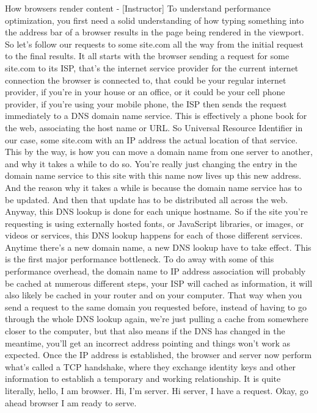 How browsers render content - [Instructor] To understand performance optimization, you first need a solid
understanding of how typing something into the address bar of a browser results 
in the page being rendered in the viewport. So let's follow our requests to some
site.com all the way from the initial request to the final results. It all 
starts with the browser sending a request for some site.com to its ISP, that's 
the internet service provider for the current internet connection the browser is
connected to, that could be your regular internet provider, if you're in your 
house or an office, or it could be your cell phone provider, if you're using 
your mobile phone, the ISP then sends the request immediately to a DNS domain 
name service. This is effectively a phone book for the web, associating the 
host name or URL. So Universal Resource Identifier in our case, some site.com 
with an IP address the actual location of that service. This by the way, is how 
you can move a domain name from one server to another, and why it takes a while 
to do so. You're really just changing the entry in the domain name service to 
this site with this name now lives up this new address. And the reason why it 
takes a while is because the domain name service has to be updated. And then 
that update has to be distributed all across the web. Anyway, this DNS lookup
is done for each unique hostname. So if the site you're requesting is using
externally hosted fonts, or JavaScript libraries, or images, or videos or 
services, this DNS lookup happens for each of those different services. 
Anytime there's a new domain name, a new DNS lookup have to take effect.
This is the first major performance bottleneck. To do away with some of this 
performance overhead, the domain name to IP address association will probably be 
cached at numerous different steps, your ISP will cached as information, it will 
also likely be cached in your router and on your computer. That way when you send
a request to the same domain you requested before, instead of having to go through 
the whole DNS lookup again, we're just pulling a cache from somewhere closer to the 
computer, but that also means if the DNS has changed in the meantime, you'll get an 
incorrect address pointing and things won't work as expected. Once the IP address is 
established, the browser and server now perform what's called a TCP handshake, where 
they exchange identity keys and other information to establish a temporary 
and working relationship. It is quite literally, hello, I am browser. Hi, I'm 
server. Hi server, I have a request. Okay, go ahead browser I am ready to serve. 
